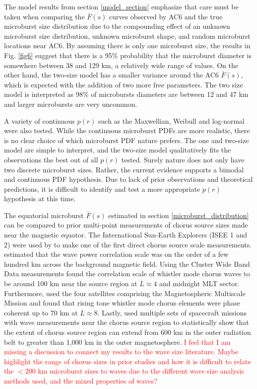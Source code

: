 \documentclass[draft]{agujournal2019}
\begin{document}
The model results from section \ref{model_section} emphasize that care must be taken when comparing the $\bar{F}(s)$ curves observed by AC6 and the true microburst size distribution due to the compounding effect of an unknown microburst size distribution, unknown microburst shape, and random microburst locations near AC6. By assuming there is only one microburst size, the results in Fig. \ref{fig6} suggest that there is a 95\% probability that the microburst diameter is somewhere between 38 and 129 km, a relatively wide range of values. On the other hand, the two-size model has a smaller variance around the AC6 $\bar{F}(s)$, which is expected with the addition of two more free parameters. The two size model is interpreted as 98\% of microbursts diameters are between 12 and 47 km and larger microbursts are very uncommon. 

A variety of continuous $p(r)$ such as the Maxwellian, Weibull and log-normal were also tested. While the continuous microburst PDFs are more realistic, there is no clear choice of which microburst PDF nature prefers. The one and two-size model are simple to interpret, and the two-size model qualitatively fits the observations the best out of all $p(r)$ tested. Surely nature does not only have two discrete microburst sizes. Rather, the current evidence supports a bimodal and continuous PDF hypothesis. Due to lack of prior observations and theoretical predictions, it is difficult to identify and test a more appropriate $p(r)$ hypothesis at this time.

The equatorial microburst $\bar{F}(s)$ estimated in section \ref{microburst_distribution} can be compared to prior multi-point measurements of chorus source sizes made near the magnetic equator. The International Sun-Earth Explorers (ISEE 1 and 2) were used by  to make one of the first direct chorus source scale measurements.  estimated that the wave power correlation scale was on the order of a few hundred km across the background magnetic field. Using the Cluster Wide Band Data measurements  found the correlation scale of whistler mode chorus waves to be around 100 km near the source region at $L \approx 4$ and midnight MLT sector. Furthermore,  used the four satellites comprising the Magnetospheric Multiscale Mission and found that rising tone whistler mode chorus elements were phase coherent up to 70 km at $L \approx 8$. Lastly,  used multiple sets of spacecraft missions with wave measurements near the chorus source region to statistically show that the extent of chorus source region can extend from 600 km in the outer radiation belt to greater than 1,000 km in the outer magnetosphere. \textcolor{red}{I feel that I am missing a discussion to connect my results to the wave size literature. Maybe highlight the range of chorus sizes in prior studies and how it is difficult to relate the $< 200$ km microburst sizes to waves due to the different wave size analysis methods used, and the mixed properties of waves?} 
\end{document}
